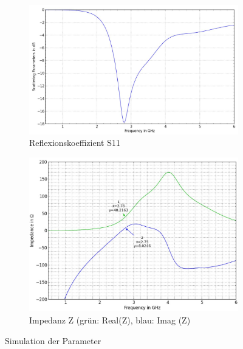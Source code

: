 \begin{figure}[htbp]
	\begin{center}
		\begin{subfigure}[t]{0.49\textwidth}
			\begin{center}
				\includegraphics[width=\textwidth]{pic/Simulationen/Simulation_S11.JPG}
				\caption{Reflexionskoeffizient S11}
				\label{fig:S11_sim}
			\end{center}
		\end{subfigure}
		\begin{subfigure}[t]{0.49\textwidth}
			\begin{center}
				\includegraphics[width=\textwidth]{pic/Simulationen/Impedanz_Monopol.JPG}
				\caption{Impedanz Z (grün: Real(Z), blau: Imag (Z)}
				\label{fig:Impedanz}
			\end{center}
		\end{subfigure}
		\caption{Simulation der Parameter}
		\label{fig:Simulationen_1}
	\end{center}
\end{figure}


